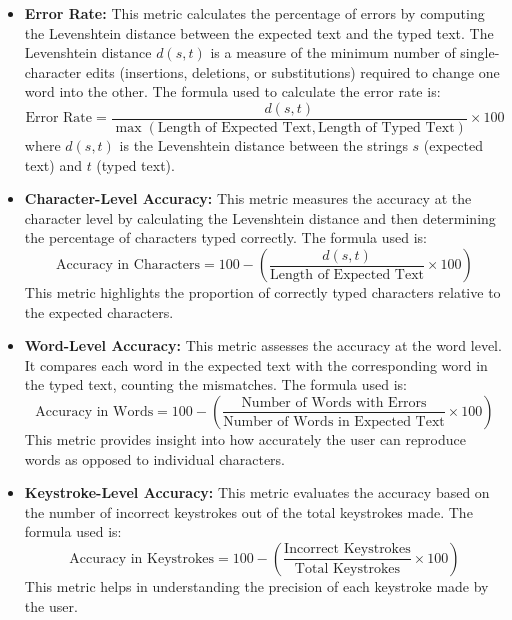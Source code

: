\begin{itemize}
    \item \textbf{Error Rate:} This metric calculates the percentage of errors by computing the Levenshtein distance between the expected text and the typed text. The Levenshtein distance \(d(s, t)\) is a measure of the minimum number of single-character edits (insertions, deletions, or substitutions) required to change one word into the other. The formula used to calculate the error rate is:
    \begin{equation}
    \text{Error Rate} = \frac{d(s, t)}{\max(\text{Length of Expected Text}, \text{Length of Typed Text})} \times 100
    \end{equation}
    where \(d(s, t)\) is the Levenshtein distance between the strings \(s\) (expected text) and \(t\) (typed text).

    \item \textbf{Character-Level Accuracy:} This metric measures the accuracy at the character level by calculating the Levenshtein distance and then determining the percentage of characters typed correctly. The formula used is:
    \begin{equation}
    \text{Accuracy in Characters} = 100 - \left( \frac{d(s, t)}{\text{Length of Expected Text}} \times 100 \right)
    \end{equation}
    This metric highlights the proportion of correctly typed characters relative to the expected characters.

    \item \textbf{Word-Level Accuracy:} This metric assesses the accuracy at the word level. It compares each word in the expected text with the corresponding word in the typed text, counting the mismatches. The formula used is:
    \begin{equation}
    \text{Accuracy in Words} = 100 - \left( \frac{\text{Number of Words with Errors}}{\text{Number of Words in Expected Text}} \times 100 \right)
    \end{equation}
    This metric provides insight into how accurately the user can reproduce words as opposed to individual characters.

    \item \textbf{Keystroke-Level Accuracy:} This metric evaluates the accuracy based on the number of incorrect keystrokes out of the total keystrokes made. The formula used is:
    \begin{equation}
    \text{Accuracy in Keystrokes} = 100 - \left( \frac{\text{Incorrect Keystrokes}}{\text{Total Keystrokes}} \times 100 \right)
    \end{equation}
    This metric helps in understanding the precision of each keystroke made by the user.


\end{itemize}

